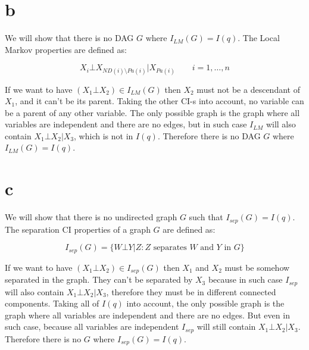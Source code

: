 \documentclass[11pt]{article}
\begin{document}
\section*{b}
We will show that there is no DAG $G$ where $I_{LM}(G)=I(q)$.
The Local Markov properties are defined as:

\begin{equation}
X_i \bot X_{ND(i) \setminus Pa(i)} | X_{Pa(i)}\qquad i=1,\ldots,n
\end{equation}

If we want to have $(X_1 \bot X_2) \in I_{LM}(G)$ then $X_2$ must not be a descendant of $X_1$,
and it can't be its parent.
Taking the other CI-s into account, no variable can be a parent of any other variable.
The only possible graph is the graph where all variables are independent and there are no edges,
but in such case $I_{LM}$ will also contain $X_1 \bot X_2 | X_3$, which is not in $I(q)$.
Therefore there is no DAG $G$ where $I_{LM}(G)=I(q)$.

\section*{c}
We will show that there is no undirected graph $G$ such that $I_{sep}(G) = I(q)$.
The separation CI properties of a graph $G$ are defined as:

\begin{equation}
I_{sep}(G) = \{W \bot Y | Z : \text{$Z$ separates $W$ and $Y$ in $G$}\}
\end{equation}

If we want to have $(X_1 \bot X_2) \in I_{sep}(G)$ then $X_1$ and  $X_2$ must be somehow separated in the graph.
They can't be separated by $X_3$ because in such case $I_{sep}$ will also contain $X_1 \bot X_2 | X_3$, therefore they must be in different connected components.
Taking all of $I(q)$ into account, the only possible graph is the graph where all variables are independent and there are no edges.
But even in such case, because all variables are independent $I_{sep}$ will still contain $X_1 \bot X_2 | X_3$. Therefore there is no $G$ where $I_{sep}(G)=I(q)$.
\end{document}
